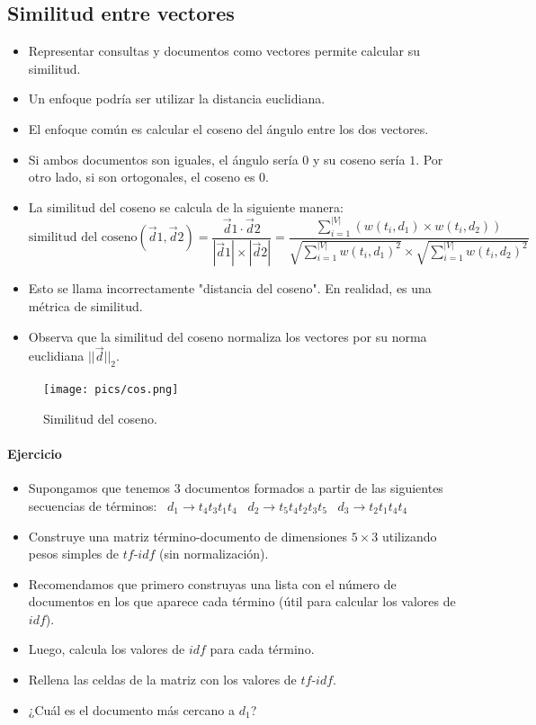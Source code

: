 \documentclass{book}
\begin{document}
\subsection{Similitud entre vectores}
\begin{itemize}
\item Representar consultas y documentos como vectores permite calcular su similitud.
\item Un enfoque podría ser utilizar la distancia euclidiana.
\item El enfoque común es calcular el coseno del ángulo entre los dos vectores.
\item Si ambos documentos son iguales, el ángulo sería $0$ y su coseno sería $1$. Por otro lado, si son ortogonales, el coseno es $0$.
\item La similitud del coseno se calcula de la siguiente manera:
\begin{displaymath}
\text{similitud del coseno}(\vec{d}{1},\vec{d}{2})= \frac{\vec{d}{1}\cdot \vec{d}{2}}{|\vec{d}{1}|\times|\vec{d}{2}|} = \frac{\sum_{i=1}^{|V|}(w(t_{i},d_{1})\times w(t_{i},d_{2}))}{\sqrt{\sum_{i=1}^{|V|} w(t_{i},d_{1})^2}\times \sqrt{\sum_{i=1}^{|V|} w(t_{i},d_{2})^2}}
\end{displaymath}
\item Esto se llama incorrectamente "distancia del coseno". En realidad, es una métrica de similitud.
\item Observa que la similitud del coseno normaliza los vectores por su norma euclidiana $||\vec{d}||_{2}$.

\end{itemize}

\begin{figure}[h!]
\centering
\texttt{[image: pics/cos.png]}
\caption{Similitud del coseno.}
\end{figure}
\paragraph{Ejercicio}
\begin{itemize}
\item Supongamos que tenemos $3$ documentos formados a partir de las siguientes secuencias de términos: \
$d_{1}\rightarrow t_{4}t_{3}t_{1}t_{4}$ \
$d_{2}\rightarrow t_{5}t_{4}t_{2}t_{3}t_{5}$ \
$d_{3}\rightarrow t_{2}t_{1}t_{4}t_{4}$ \
\item Construye una matriz término-documento de dimensiones $5\times3$ utilizando pesos simples de $tf$-$idf$ (sin normalización).
\item Recomendamos que primero construyas una lista con el número de documentos en los que aparece cada término (útil para calcular los valores de $idf$).
\item Luego, calcula los valores de $idf$ para cada término.
\item Rellena las celdas de la matriz con los valores de $tf$-$idf$.
\item ¿Cuál es el documento más cercano a $d_{1}$?
\end{itemize}
\end{document}
